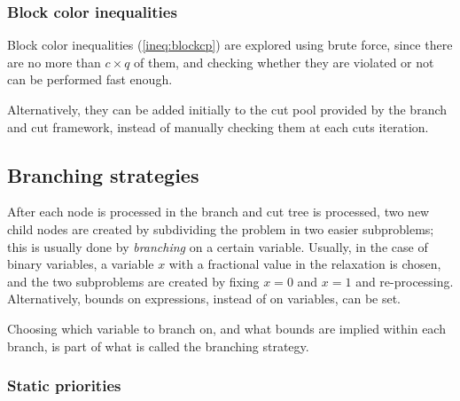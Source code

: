 \subsubsection*{Block color inequalities}

Block color inequalities (\ref{ineq:blockcp}) are explored using brute force, since there are no more than $c \times q$ of them, and checking whether they are violated or not can be performed fast enough.

Alternatively, they can be added initially to the cut pool provided by the branch and cut framework, instead of manually checking them at each cuts iteration.

\subsection{Branching strategies}

After each node is processed in the branch and cut tree is processed, two new child nodes are created by subdividing the problem in two easier subproblems; this is usually done by \textit{branching} on a certain variable. Usually, in the case of binary variables, a variable $x$ with a fractional value in the relaxation is chosen, and the two subproblems are created by fixing $x = 0$ and $x = 1$ and re-processing. Alternatively, bounds on expressions, instead of on variables, can be set.

\begin{figure}[h]
	\label{fig:branching}
	\centering
\end{figure}

Choosing which variable to branch on, and what bounds are implied within each branch, is part of what is called the branching strategy. 

\subsubsection*{Static priorities}

